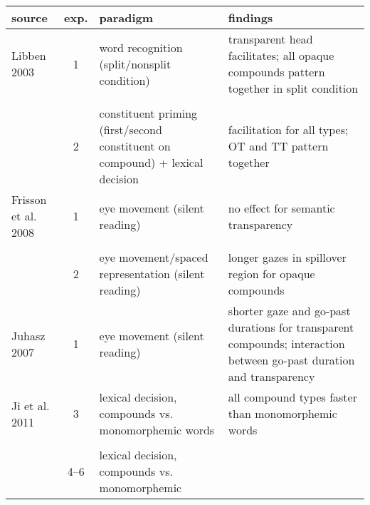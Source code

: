 \begin{table}[p]
{\footnotesize
\begin{tabular}[t]{>{\raggedright\arraybackslash}p{1cm}c>{\raggedright\arraybackslash}p{4cm}>{\raggedright\arraybackslash}p{5cm}}
source&exp.&paradigm&findings\\\midrule
Libben 2003&1&word recognition (split/nonsplit condition)&transparent head facilitates; all opaque compounds
pattern together in split condition\\\\[-.5em]  %
&2&constituent priming (first/second constituent on compound) + lexical decision&facilitation for all types; OT and TT pattern together\\\midrule
Frisson et al. 2008&1&eye movement (silent reading)&no effect
for semantic transparency\\\\[-.5em]  %
&2&eye movement/spaced representation (silent
reading)&longer gazes in spillover region for opaque compounds\\\midrule
Juhasz 2007&1&eye movement (silent reading)&shorter gaze
and go-past durations for transparent compounds; interaction between
go-past duration and transparency\\\midrule
Ji et al. 2011&3&lexical decision, compounds vs. monomorphemic
words&all compound types faster than monomorphemic words\\\\[-.5em] %
&4--6&lexical decision, compounds vs. monomorphemic

\end{tabular}}
\end{table}

